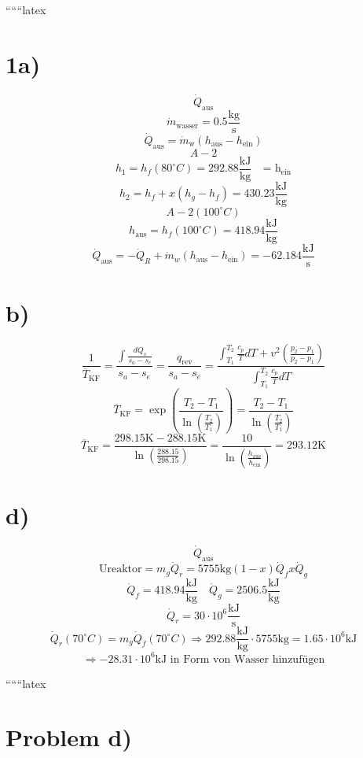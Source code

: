 
``````latex


\section*{1a)}
\[
\dot{Q}_{\text{aus}}
\]
\[
\dot{m}_{\text{wasser}} = 0.5 \frac{\text{kg}}{\text{s}}
\]
\[
\dot{Q}_{\text{aus}} = \dot{m}_{\text{w}} (h_{\text{aus}} - h_{\text{ein}})
\]
\[
A-2
\]
\[
h_1 = h_f(80^\circ C) = 292.88 \frac{\text{kJ}}{\text{kg}} \quad \text{= h}_{\text{ein}}
\]
\[
h_2 = h_f + x(h_g - h_f) = 430.23 \frac{\text{kJ}}{\text{kg}}
\]
\[
A-2(100^\circ C)
\]
\[
h_{\text{aus}} = h_f(100^\circ C) = 418.94 \frac{\text{kJ}}{\text{kg}}
\]
\[
\dot{Q}_{\text{aus}} = -\dot{Q}_R + \dot{m}_w (h_{\text{aus}} - h_{\text{ein}}) = -62.184 \frac{\text{kJ}}{\text{s}}
\]

\section*{b)}
\[
\frac{1}{\overline{T}_{\text{KF}}} = \frac{\int \frac{dQ_s}{s_a - s_e}}{s_a - s_e} = \frac{q_{\text{rev}}}{s_a - s_e} = \frac{\int_{T_1}^{T_2} \frac{c_p}{T} dT + v^2 \left( \frac{p_2 - p_1}{p_2 - p_1} \right)}{\int_{T_1}^{T_2} \frac{c_p}{T} dT}
\]
\[
\overline{T}_{\text{KF}} = \exp \left( \frac{T_2 - T_1}{\ln \left( \frac{T_2}{T_1} \right)} \right) = \frac{T_2 - T_1}{\ln \left( \frac{T_2}{T_1} \right)}
\]
\[
\overline{T}_{\text{KF}} = \frac{298.15 \text{K} - 288.15 \text{K}}{\ln \left( \frac{288.15}{298.15} \right)} = \frac{10}{\ln \left( \frac{h_{\text{aus}}}{h_{\text{ein}}} \right)} = 293.12 \text{K}
\]

\section*{d)}
\[
\dot{Q}_{\text{aus}}
\]
\[
\text{Ureaktor} = m_g \dot{Q}_r = 5755 \text{kg} (1 - x) \dot{Q}_f x \dot{Q}_g
\]
\[
\dot{Q}_f = 418.94 \frac{\text{kJ}}{\text{kg}} \quad \dot{Q}_g = 2506.5 \frac{\text{kJ}}{\text{kg}}
\]
\[
\dot{Q}_r = 30 \cdot 10^6 \frac{\text{kJ}}{\text{s}}
\]
\[
\dot{Q}_r (70^\circ C) = m_g \dot{Q}_f (70^\circ C) \Rightarrow 292.88 \frac{\text{kJ}}{\text{kg}} \cdot 5755 \text{kg} = 1.65 \cdot 10^6 \text{kJ}
\]
\[
\Rightarrow -28.31 \cdot 10^6 \text{kJ} \text{ in Form von Wasser hinzufügen}
\]

``````latex

\section*{Problem d)}

